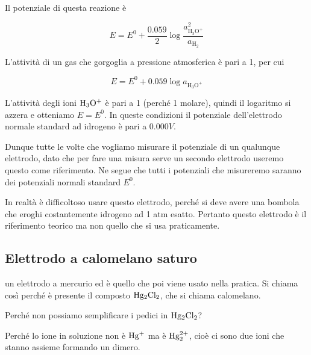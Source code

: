 Il potenziale di questa reazione è

$$E = E^0 + \frac{0.059}{2} \log \frac{a^2_{\text{H}_3\text{O}^+}}{a_{\text{H}_2}}$$

L'attività di un gas che gorgoglia a pressione atmosferica è pari a 1, per cui

$$E = E^0 + 0.059 \log a_{\text{H}_3\text{O}^+}$$

L'attività degli ioni $\rm H_3O^+$ è pari a 1 (perché 1 molare), quindi il logaritmo si azzera e otteniamo $E=E^0$. In queste condizioni il potenziale dell'elettrodo normale standard ad idrogeno è pari a $0.000 V$.

Dunque tutte le volte che vogliamo misurare il potenziale di un qualunque elettrodo, dato che per fare una misura serve un secondo elettrodo useremo questo come riferimento. Ne segue che tutti i potenziali che misureremo saranno dei potenziali normali standard $E^0$.

In realtà è difficoltoso usare questo elettrodo, perché si deve avere una bombola che eroghi costantemente idrogeno ad 1 atm esatto. Pertanto questo elettrodo è il riferimento teorico ma non quello che si usa praticamente.
\subsection{Elettrodo a calomelano saturo}
\E un elettrodo a mercurio ed è quello che poi viene usato nella pratica. Si chiama così perché è presente il composto $\rm Hg_2Cl_2$, che si chiama calomelano.

Perché non possiamo semplificare i pedici in $\rm Hg_2Cl_2$?

Perché lo ione in soluzione non è $\rm Hg^+$ ma è $\rm Hg_2^{2+}$, cioè ci sono due ioni che stanno assieme formando un dimero.

